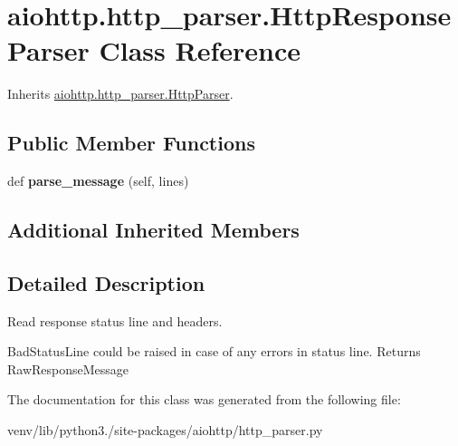 \hypertarget{classaiohttp_1_1http__parser_1_1_http_response_parser}{}\section{aiohttp.\+http\+\_\+parser.\+Http\+Response\+Parser Class Reference}
\label{classaiohttp_1_1http__parser_1_1_http_response_parser}


Inherits \hyperlink{classaiohttp_1_1http__parser_1_1_http_parser}{aiohttp.\+http\+\_\+parser.\+Http\+Parser}.

\subsection*{Public Member Functions}
\begin{DoxyCompactItemize}
\item 
\mbox{\label{classaiohttp_1_1http__parser_1_1_http_response_parser_a40031c72e5898e718a1a59a00141d334}} 
def {\bfseries parse\+\_\+message} (self, lines)
\end{DoxyCompactItemize}
\subsection*{Additional Inherited Members}


\subsection{Detailed Description}
\begin{DoxyVerb}Read response status line and headers.

BadStatusLine could be raised in case of any errors in status line.
Returns RawResponseMessage\end{DoxyVerb}
 

The documentation for this class was generated from the following file\+:\begin{DoxyCompactItemize}
\item 
venv/lib/python3./site-\/packages/aiohttp/http\+\_\+parser.\+py\end{DoxyCompactItemize}
